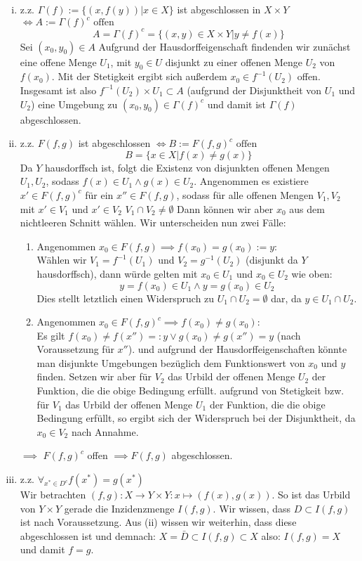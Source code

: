 \documentclass{scrartcl}
\begin{document}
\begin{aufgabe}
\begin{enumerate}[(i)]
\item z.z. $ \Gamma (f):=\{(x,f(y))|x\in X\} $ ist abgeschlossen in $ X\times Y $ $\iff A:=\Gamma(f)^c \text{ offen}$ \\
\[
A=\Gamma(f)^c =\{ (x,y)\in X\times Y|y\neq f(x)\} 
\]
Sei $ (x_0, y_0)\in A $ Aufgrund der Hausdorffeigenschaft findenden wir zunächst eine offene Menge $ U_1 $, mit $ y_0\in U $ disjunkt zu einer offenen Menge $ U_2 $ von $ f(x_0) $. Mit der Stetigkeit ergibt sich außerdem $ x_0\in f^{-1}(U_2) $ offen.  Insgesamt ist also $ f^{-1}(U_2)\times U_1\subset A $ (aufgrund der Disjunktheit von $ U_1 $ und $ U_2 $) eine Umgebung zu $ (x_0,y_0)\in \Gamma(f)^c $ und damit ist $ \Gamma(f) $ abgeschlossen.
\item z.z. $ F(f,g) $ ist abgeschlossen $ \iff B:=F(f,g)^c \text{ offen} $\\
\[
B=\{x\in X|f(x)\neq g(x)\}
\]
Da $ Y $ hausdorffsch ist, folgt die Existenz von disjunkten offenen Mengen $ U_1, U_2 $, sodass $ f(x)\in U_1 \land g(x)\in U_2 $. Angenommen es existiere $ x'\in F(f,g)^c $ für ein $ x'' \in F(f,g) $, sodass für alle offenen Mengen $ V_1, V_2 $ mit $ x'\in V_1 $ und $ x'\in V_2 $  $ V_1\cap V_2\neq \emptyset $ Dann können wir aber $ x_0 $ aus dem nichtleeren Schnitt wählen.  Wir unterscheiden nun zwei Fälle:
\begin{enumerate}
\item Angenommen $ x_0\in F(f,g)\implies f(x_0)=g(x_0):=y $:\\
Wählen wir $ V_1=f^{-1}(U_1) $ und $ V_2=g^{-1}(U_2) $ (disjunkt da $ Y $ hausdorffsch), dann würde gelten mit $ x_0\in U_1 $ und $ x_0\in U_2 $ wie oben:
\[
y=f(x_0)\in U_1 \land y=g(x_0)\in U_2
\]
Dies stellt letztlich einen Widerspruch zu $ U_1\cap U_2=\emptyset $ dar, da $ y\in U_1\cap U_2 $.
\item Angenommen $ x_0\in F(f,g)^c\implies f(x_0)\neq g(x_0) $:\\
Es gilt $ f(x_0)\neq f(x'')=:y \lor g(x_0)\neq g(x'')=y $ (nach Voraussetzung für $ x'' $).  und aufgrund der Hausdorffeigenschaften könnte man disjunkte Umgebungen bezüglich dem Funktionswert von $ x_0 $ und $ y $ finden. Setzen wir aber für $ V_2 $ das Urbild der offenen Menge $ U_2 $ der Funktion, die die obige Bedingung erfüllt. aufgrund von Stetigkeit bzw. für $ V_1 $ das Urbild der offenen Menge $ U_1 $ der Funktion, die die obige Bedingung erfüllt, so ergibt sich der Widerspruch bei der Disjunktheit, da $ x_0\in V_2 $ nach Annahme.  
\end{enumerate}
$ \implies $ $ F(f,g)^c $ offen $ \implies F(f,g) $ abgeschlossen.
\item z.z. $ \forall_{x^*\in D^c} f(x^*)=g(x^*) $\\
Wir betrachten $ (f,g):X\to Y\times Y: x\mapsto (f(x),g(x)) $.  So ist das Urbild von $ Y\times Y $ gerade die Inzidenzmenge $ I(f,g) $.  Wir wissen, dass $ D\subset I(f,g) $ ist nach Voraussetzung. Aus (ii) wissen wir weiterhin, dass diese abgeschlossen ist und demnach:  $X=\bar D\subset I(f,g)\subset X$ also: $ I(f,g)=X $ und damit $ f=g $.
\end{enumerate}
\end{aufgabe}
\end{document}

